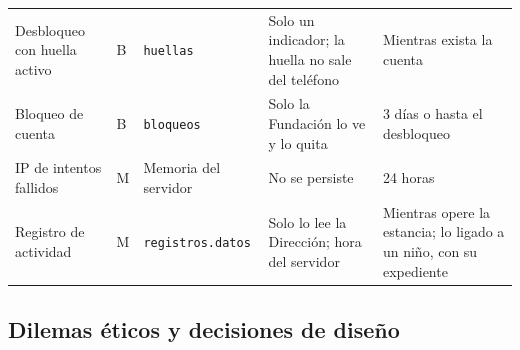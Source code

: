 {\begin{longtable}{p{3.6cm}p{1.3cm}p{3.2cm}p{3.6cm}p{3.0cm}}
Desbloqueo con huella activo & B & \texttt{huellas} & Solo un indicador; la huella no sale del teléfono & Mientras exista la cuenta\\
Bloqueo de cuenta & B & \texttt{bloqueos} & Solo la Fundación lo ve y lo quita & 3 días o hasta el desbloqueo\\
IP de intentos fallidos & M & Memoria del servidor & No se persiste & 24 horas\\
Registro de actividad & M & \texttt{registros.\allowbreak{}datos} & Solo lo lee la Dirección; hora del servidor & Mientras opere la estancia; lo ligado a un niño, con su expediente\\
\bottomrule
\end{longtable}}

\subsection{Dilemas éticos y decisiones de diseño}

